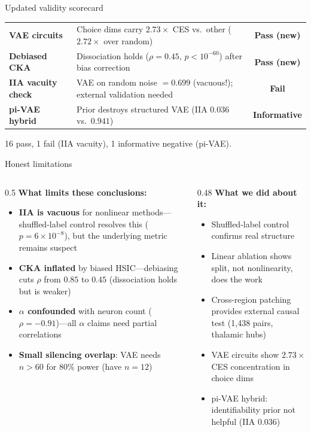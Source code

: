 \documentclass[aspectratio=169,11pt]{beamer}
\begin{document}
\begin{frame}{Updated validity scorecard}
{\begin{tabular}{lp{7cm}c}
\textbf{VAE circuits} & Choice dims carry $2.73\times$ CES vs.\ other ($2.72\times$ over random) & \textcolor{pass}{\textbf{Pass (new)}} \\
\textbf{Debiased CKA} & Dissociation holds ($\rho = 0.45$, $p < 10^{-60}$) after bias correction & \textcolor{pass}{\textbf{Pass (new)}} \\
\textbf{IIA vacuity check} & VAE on random noise $= 0.699$ (vacuous!); external validation needed & \textcolor{fail}{\textbf{Fail}} \\
\textbf{pi-VAE hybrid} & Prior destroys structured VAE (IIA $0.036$ vs.\ $0.941$) & \textcolor{partial}{\textbf{Informative}} \\
\bottomrule
\end{tabular}
}

\vspace{0.3em}
{\small 16 pass, 1 fail (IIA vacuity), 1 informative negative (pi-VAE).}
\end{frame}

\begin{frame}{Honest limitations}
\begin{columns}[T]
\begin{column}{0.5\textwidth}
\textbf{What limits these conclusions:}
\begin{itemize}
  \item \textbf{IIA is vacuous} for nonlinear methods---shuffled-label control resolves this ($p = 6 \times 10^{-8}$), but the underlying metric remains suspect
  \item \textbf{CKA inflated} by biased HSIC---debiasing cuts $\rho$ from $0.85$ to $0.45$ (dissociation holds but is weaker)
  \item \textbf{$\alpha$ confounded} with neuron count ($\rho = -0.91$)---all $\alpha$ claims need partial correlations
  \item \textbf{Small silencing overlap}: VAE needs $n > 60$ for 80\% power (have $n = 12$)
\end{itemize}
\end{column}
\begin{column}{0.48\textwidth}
\textbf{What we did about it:}
\begin{itemize}
  \item Shuffled-label control confirms real structure
  \item Linear ablation shows split, not nonlinearity, does the work
  \item Cross-region patching provides external causal test (1,438 pairs, thalamic hubs)
  \item VAE circuits show $2.73\times$ CES concentration in choice dims
  \item pi-VAE hybrid: identifiability prior not helpful (IIA $0.036$)
\end{itemize}
\end{column}
\end{columns}
\end{frame}
\end{document}
